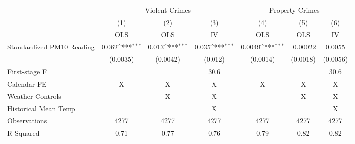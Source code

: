 {
\def\sym#1{\ifmmode^{#1}\else\(^{#1}\)\fi}
\begin{tabular}{l*{6}{c}}
\toprule
                    &\multicolumn{3}{c}{Violent Crimes}                               &\multicolumn{3}{c}{Property Crimes}                              \\\cmidrule(lr){2-4}\cmidrule(lr){5-7}
                    &\multicolumn{1}{c}{(1)}&\multicolumn{1}{c}{(2)}&\multicolumn{1}{c}{(3)}&\multicolumn{1}{c}{(4)}&\multicolumn{1}{c}{(5)}&\multicolumn{1}{c}{(6)}\\
                    &\multicolumn{1}{c}{OLS}&\multicolumn{1}{c}{OLS}&\multicolumn{1}{c}{IV}&\multicolumn{1}{c}{OLS}&\multicolumn{1}{c}{OLS}&\multicolumn{1}{c}{IV}\\
\midrule
Standardized PM10 Reading&       0.062\sym{***}&       0.013\sym{***}&       0.035\sym{***}&      0.0049\sym{***}&    -0.00022         &      0.0055         \\
                    &    (0.0035)         &    (0.0042)         &     (0.012)         &    (0.0014)         &    (0.0018)         &    (0.0056)         \\
\midrule
First-stage F       &                     &                     &        30.6         &                     &                     &        30.6         \\
Calendar FE         &           X         &           X         &           X         &           X         &           X         &           X         \\
Weather Controls    &                     &           X         &           X         &                     &           X         &           X         \\
Historical Mean Temp&                     &                     &           X         &                     &                     &           X         \\
Observations        &        4277         &        4277         &        4277         &        4277         &        4277         &        4277         \\
R-Squared           &        0.71         &        0.77         &        0.76         &        0.79         &        0.82         &        0.82         \\
\bottomrule
\end{tabular}
}
